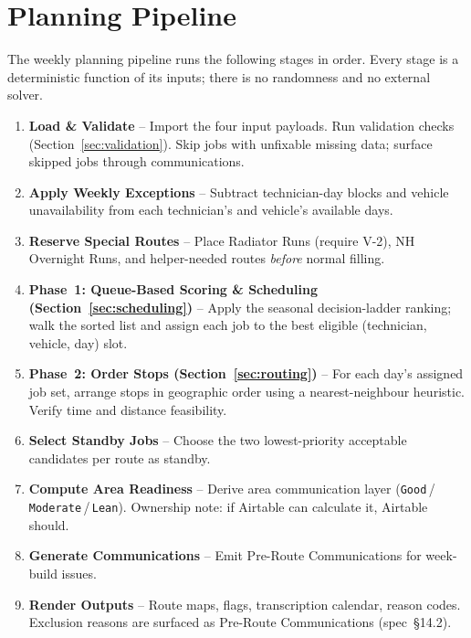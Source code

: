 \documentclass[12pt]{article}
\begin{document}
\section*{Planning Pipeline}
\label{sec:pipeline}

The weekly planning pipeline runs the following stages in order.
Every stage is a deterministic function of its inputs; there is no randomness and no external solver.

\begin{enumerate}
    \item \textbf{Load \& Validate} -- Import the four input payloads.  Run validation checks (Section~\ref{sec:validation}).  Skip jobs with unfixable missing data; surface skipped jobs through communications.
    \item \textbf{Apply Weekly Exceptions} -- Subtract technician-day blocks and vehicle unavailability from each technician's and vehicle's available days.
    \item \textbf{Reserve Special Routes} -- Place Radiator Runs (require V-2), NH Overnight Runs, and helper-needed routes \emph{before} normal filling.
    \item \textbf{Phase~1: Queue-Based Scoring \& Scheduling (Section~\ref{sec:scheduling})} -- Apply the seasonal decision-ladder ranking; walk the sorted list and assign each job to the best eligible (technician, vehicle, day) slot.
    \item \textbf{Phase~2: Order Stops (Section~\ref{sec:routing})} -- For each day's assigned job set, arrange stops in geographic order using a nearest-neighbour heuristic.  Verify time and distance feasibility.
    \item \textbf{Select Standby Jobs} -- Choose the two lowest-priority acceptable candidates per route as standby.
    \item \textbf{Compute Area Readiness} -- Derive area communication layer (\texttt{Good}\,/\,\texttt{Moderate}\,/\,\texttt{Lean}).  Ownership note: if Airtable can calculate it, Airtable should.
    \item \textbf{Generate Communications} -- Emit Pre-Route Communications for week-build issues.
    \item \textbf{Render Outputs} -- Route maps, flags, transcription calendar, reason codes.  Exclusion reasons are surfaced as Pre-Route Communications (spec~\S14.2).
\end{enumerate}
\end{document}
